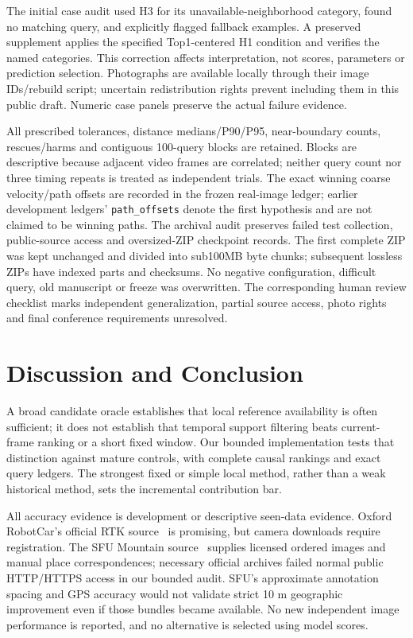 \documentclass[conference]{IEEEtran}
\begin{document}
The initial case audit used H3 for its unavailable-neighborhood category, found no matching query, and explicitly flagged fallback examples. A preserved supplement applies the specified Top1-centered H1 condition and verifies the named categories. This correction affects interpretation, not scores, parameters or prediction selection. Photographs are available locally through their image IDs/rebuild script; uncertain redistribution rights prevent including them in this public draft. Numeric case panels preserve the actual failure evidence.

All prescribed tolerances, distance medians/P90/P95, near-boundary counts, rescues/harms and contiguous 100-query blocks are retained. Blocks are descriptive because adjacent video frames are correlated; neither query count nor three timing repeats is treated as independent trials. The exact winning coarse velocity/path offsets are recorded in the frozen real-image ledger; earlier development ledgers' \texttt{path\_offsets} denote the first hypothesis and are not claimed to be winning paths. The archival audit preserves failed test collection, public-source access and oversized-ZIP checkpoint records. The first complete ZIP was kept unchanged and divided into sub100MB byte chunks; subsequent lossless ZIPs have indexed parts and checksums. No negative configuration, difficult query, old manuscript or freeze was overwritten. The corresponding human review checklist marks independent generalization, partial source access, photo rights and final conference requirements unresolved.

\section{Discussion and Conclusion}
A broad candidate oracle establishes that local reference availability is often sufficient; it does not establish that temporal support filtering beats current-frame ranking or a short fixed window. Our bounded implementation tests that distinction against mature controls, with complete causal rankings and exact query ledgers. The strongest fixed or simple local method, rather than a weak historical method, sets the incremental contribution bar.

All accuracy evidence is development or descriptive seen-data evidence. Oxford RobotCar's official RTK source~\cite{robotcar} is promising, but camera downloads require registration. The SFU Mountain source~\cite{sfu} supplies licensed ordered images and manual place correspondences; necessary official archives failed normal public HTTP/HTTPS access in our bounded audit. SFU's approximate annotation spacing and GPS accuracy would not validate strict 10 m geographic improvement even if those bundles became available. No new independent image performance is reported, and no alternative is selected using model scores.
\end{document}

